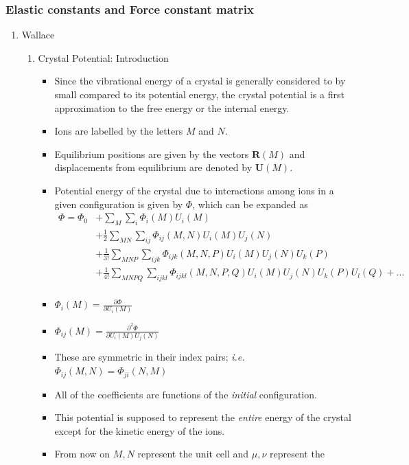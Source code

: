 \documentclass[11pt]{article}
\begin{document}
\subsubsection{Elastic constants and Force constant matrix}
\label{sec:org613331d}
\begin{enumerate}
\item Wallace
\label{sec:org42c5371}
\begin{enumerate}
\item Crystal Potential: Introduction
\label{sec:org2c8603f}
\begin{itemize}
\item Since the vibrational energy of a crystal is generally considered to by
small compared to its potential energy, the crystal potential is a first
approximation to the free energy or the internal energy.
\item Ions are labelled by the letters \(M\) and \(N\).
\item Equilibrium positions are given by the vectors \(\mathbf{R}(M)\) and
displacements from equilibrium are denoted by \(\mathbf{U}(M)\).
\item Potential energy of the crystal due to interactions among ions in a
given configuration is given by \(\Phi\), which can be expanded as
\begin{align}
\Phi = \Phi_{0} &+ \sum_{M}\sum_{i} \Phi_{i}(M)U_{i}(M) \\ 
     &+ \frac{1}{2}\sum_{MN}\sum_{ij}\Phi_{ij}(M,N)U_i(M)U_j(N)\\ 
     &+ \frac{1}{3!} \sum_{MNP}\sum_{ijk}\Phi_{ijk}(M,N,P)U_{i}(M)U_{j}(N)U_{k}(P) \\
     &+ \frac{1}{4!} \sum_{MNPQ}\sum_{ijkl}\Phi_{ijkl}(M,N,P,Q)U_{i}(M)U_{j}(N)U_{k}(P)U_{l}(Q) + \dots \\
\end{align}
\item \(\Phi_{i}(M) = \frac{\partial \Phi}{\partial U_{i}(M)}\)
\item \(\Phi_{ij}(M) = \frac{\partial^{2} \Phi}{\partial U_{i}(M)U_{j}(N)}\)
\item These are symmetric in their index pairs; \emph{i.e.} \(\Phi_{ij}(M,N) = \Phi_{ji}(N,M)\)
\item All of the coefficients are functions of the \emph{initial} configuration.
\item This potential is supposed to represent the \emph{entire} energy of the crystal
except for the kinetic energy of the ions.
\item From now on \(M, N\) represent the unit cell and \(\mu, \nu\) represent the

\end{itemize}
\end{enumerate}
\end{enumerate}
\end{document}
